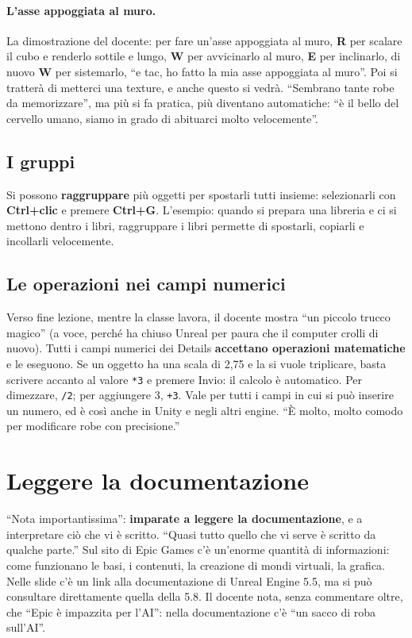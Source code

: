 \paragraph{L'asse appoggiata al muro.} La dimostrazione del docente: per fare
un'asse appoggiata al muro, \textbf{R} per scalare il cubo e renderlo sottile
e lungo, \textbf{W} per avvicinarlo al muro, \textbf{E} per inclinarlo, di
nuovo \textbf{W} per sistemarlo, ``e tac, ho fatto la mia asse appoggiata al
muro''. Poi si tratterà di metterci una texture, e anche questo si vedrà.
``Sembrano tante robe da memorizzare'', ma più si fa pratica, più diventano
automatiche: ``è il bello del cervello umano, siamo in grado di abituarci
molto velocemente''.

\subsection{I gruppi}

Si possono \textbf{raggruppare} più oggetti per spostarli tutti insieme:
selezionarli con \textbf{Ctrl+clic} e premere \textbf{Ctrl+G}. L'esempio:
quando si prepara una libreria e ci si mettono dentro i libri, raggruppare i
libri permette di spostarli, copiarli e incollarli velocemente.

\subsection{Le operazioni nei campi numerici}

Verso fine lezione, mentre la classe lavora, il docente mostra ``un piccolo
trucco magico'' (a voce, perché ha chiuso Unreal per paura che il computer
crolli di nuovo). Tutti i campi numerici dei Details \textbf{accettano
operazioni matematiche} e le eseguono. Se un oggetto ha una scala di 2,75 e la
si vuole triplicare, basta scrivere accanto al valore \texttt{*3} e premere
Invio: il calcolo è automatico. Per dimezzare, \texttt{/2}; per aggiungere 3,
\texttt{+3}. Vale per tutti i campi in cui si può inserire un numero, ed è
così anche in Unity e negli altri engine. ``È molto, molto comodo per
modificare robe con precisione.''

\section{Leggere la documentazione}
\label{gd8:sec:documentazione}

``Nota importantissima'': \textbf{imparate a leggere la documentazione}, e a
interpretare ciò che vi è scritto. ``Quasi tutto quello che vi serve è scritto
da qualche parte.'' Sul sito di Epic Games c'è un'enorme quantità di
informazioni: come funzionano le basi, i contenuti, la creazione di mondi
virtuali, la grafica. Nelle slide c'è un link alla documentazione di Unreal
Engine 5.5, ma si può consultare direttamente quella della 5.8. Il docente
nota, senza commentare oltre, che ``Epic è impazzita per l'AI'': nella
documentazione c'è ``un sacco di roba sull'AI''.

